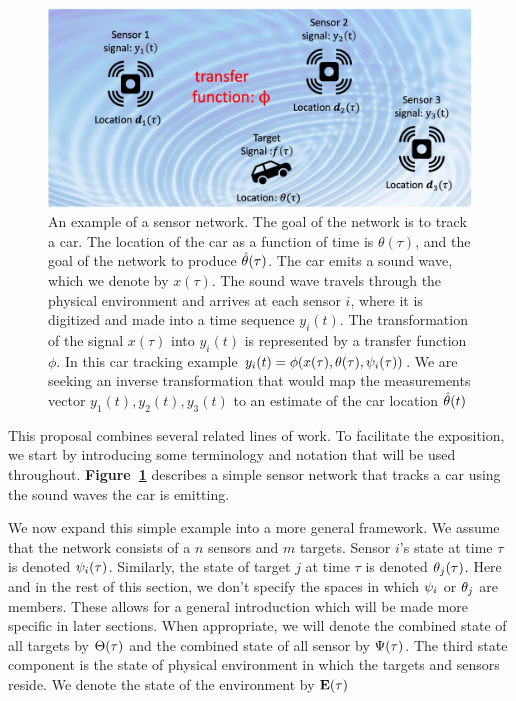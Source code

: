 \documentclass{article}
\begin{document}
\newcommand{\signal}{\mathbf{x}}
\newcommand{\Vsignal}{\mathbf{X}}
\newcommand{\dsignal}{\mathbf{y}}
\newcommand{\Vdsignal}{\mathbf{Y}}
\newcommand{\dtime}{t}
\newcommand{\ctime}{\tau}

\begin{figure}[t]
\centering
\includegraphics[width=0.9\columnwidth]{figs/Framework.jpg}
\caption{An example of a sensor network\label{fig:prototypicalSensorNetwork}. The goal of the network is to track a car. The location of the car as a function of time is $\theta(\ctime)$, and the goal of the network to produce $\estate(\ctime)$. The car emits a sound wave, which we denote by $x(\ctime)$. The sound wave travels through the physical environment and arrives at each sensor $i$, where it is digitized and made into a time sequence $y_i(\dtime)$. The transformation of the signal $x(\ctime)$ into $y_i(\dtime)$ is represented by a transfer function $\phi$. In this car tracking example 
$y_i(\dtime) = \phi(x(\ctime),\state(\ctime),\Sstate_i(\ctime))$. We are seeking an inverse transformation that would map the measurements vector $y_1(\dtime),y_2(\dtime),y_3(\dtime)$ to an estimate of the car location $\estate(\dtime)$}
\end{figure}

This proposal combines several related lines of work. To facilitate the exposition, we start by introducing some terminology and notation that will be used throughout. {\bf Figure~\ref{fig:prototypicalSensorNetwork}} describes a simple sensor network that tracks a car using the sound waves the car is emitting.

We now expand this simple example into a more general framework.
We assume that the network consists of a $n$ sensors and $m$ 
targets. Sensor $i$'s state at time $\ctime$ is denoted $\Sstate_i(\ctime)$.  Similarly, the state of target $j$ at time $\ctime$ is denoted $\state_j(\ctime)$.
Here and in the rest of this section, we don't specify the spaces in which  $\psi_i$ or $\theta_j$ are members. These allows for a general introduction which will be made more specific in later sections. When appropriate, we will denote the combined state of all targets by $\Vstate(\ctime)$ and the combined state of all sensor by $\VSstate(\ctime)$. The third state component is the state of physical environment in which the targets and sensors reside. We denote the state of the environment by $\env(\ctime)$
\end{document}
